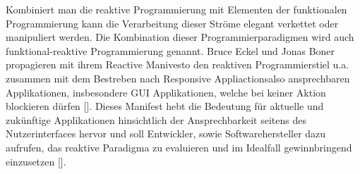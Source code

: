 \documentclass[12pt,oneside,a4paper,bibtotoc,liststotoc]{scrreprt}
\begin{document}
Kombiniert man die reaktive Programmierung mit Elementen der funktionalen Programmierung kann die Verarbeitung dieser Ströme elegant verkettet oder manipuliert werden. Die Kombination dieser Programmierparadigmen wird auch funktional-reaktive Programmierung genannt.
\newline
\newline
\newline
Bruce Eckel und Jonas Boner propagieren mit ihrem Reactive Manivesto den reaktiven Programmierstiel u.a. zusammen mit dem Bestreben nach \glqq Responsive Appliactions\grqq also ansprechbaren Applikationen, insbesondere GUI Applikationen, welche bei keiner Aktion blockieren dürfen [\cite{heiseReactiveManifesto}]. Dieses Manifest hebt die Bedeutung für aktuelle und zukünftige Applikationen hinsichtlich der Ansprechbarkeit seitens des Nutzerinterfaces hervor und soll Entwickler, sowie Softwarehersteller dazu aufrufen, das reaktive Paradigma zu evaluieren und im Idealfall gewinnbringend einzusetzen [\citet{reactiveManifesto}].
\end{document}
